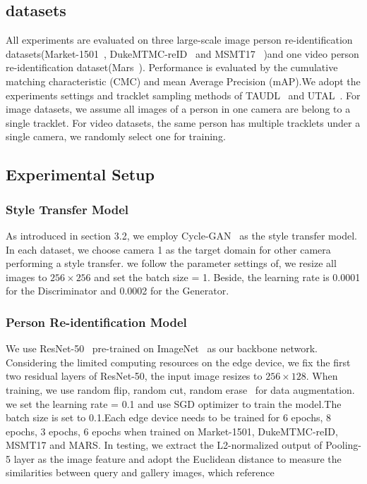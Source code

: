 \documentclass{article}
\begin{document}
\subsection{datasets}

All experiments are evaluated on three large-scale image person re-identification datasets(Market-1501~\cite{zheng2015scalable}, DukeMTMC-reID~\cite{ristani2016performance,zheng2017unlabeled} and MSMT17~\cite{wei2018person} )and one video person re-identification dataset(Mars~\cite{zheng2016mars}). Performance is evaluated by the cumulative matching characteristic (CMC) and mean Average Precision (mAP).We adopt the experiments settings and tracklet sampling methods of TAUDL~\cite{li2018unsupervised} and UTAL~\cite{li2019unsupervised}.  For image datasets, we assume all images of a person in one camera are belong to a single tracklet. For video datasets,  the same person has multiple tracklets under a single camera, we randomly select one for training.


\subsection{Experimental Setup}


\subsubsection{Style Transfer Model}
As introduced in section 3.2,  we employ Cycle-GAN~\cite{zhu2017unpaired} as the style transfer model. In each dataset, we choose camera 1 as the target domain for other camera performing a style transfer. we follow the parameter settings of, we resize all images to $256\times 256$ and set the batch size = 1. Beside, the learning rate is 0.0001 for the Discriminator and 0.0002 for the Generator.

\subsubsection{Person Re-identification Model}
We use ResNet-50~\cite{he2016deep} pre-trained on ImageNet~\cite{deng2009imagenet} as our backbone network. Considering the limited computing resources on the edge device, we fix the first two residual layers of ResNet-50, the input image resizes to $256\times128$. When training, we use random flip, random cut, random erase~\cite{zhong2017random} for data augmentation. we set the learning rate = 0.1 and use SGD optimizer to train the model.The batch size is set to 0.1.Each edge device needs to be trained for 6 epochs, 8 epochs, 3 epochs, 6 epochs when trained on Market-1501, DukeMTMC-reID, MSMT17 and MARS. In testing, we extract the L2-normalized output of Pooling-5 layer as the image feature and adopt the Euclidean distance to measure the similarities between query and gallery images, which reference ~\cite{zhong2019invariance}
\end{document}
